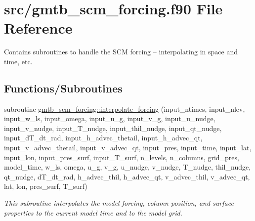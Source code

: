 \hypertarget{gmtb__scm__forcing_8f90}{}\section{src/gmtb\+\_\+scm\+\_\+forcing.f90 File Reference}
\label{gmtb__scm__forcing_8f90}


Contains subroutines to handle the S\+CM forcing -- interpolating in space and time, etc.  


\subsection*{Functions/\+Subroutines}
{\bf }\par
\begin{DoxyCompactItemize}
\item 
subroutine \hyperlink{group__forcing_gaee4d8a92d081863df4499f2e1dce82bd}{gmtb\+\_\+scm\+\_\+forcing\+::interpolate\+\_\+forcing} (input\+\_\+ntimes, input\+\_\+nlev, input\+\_\+w\+\_\+ls, input\+\_\+omega, input\+\_\+u\+\_\+g, input\+\_\+v\+\_\+g, input\+\_\+u\+\_\+nudge,           input\+\_\+v\+\_\+nudge, input\+\_\+\+T\+\_\+nudge, input\+\_\+thil\+\_\+nudge, input\+\_\+qt\+\_\+nudge, input\+\_\+d\+T\+\_\+dt\+\_\+rad, input\+\_\+h\+\_\+advec\+\_\+thetail, input\+\_\+h\+\_\+advec\+\_\+qt,           input\+\_\+v\+\_\+advec\+\_\+thetail, input\+\_\+v\+\_\+advec\+\_\+qt, input\+\_\+pres, input\+\_\+time, input\+\_\+lat, input\+\_\+lon, input\+\_\+pres\+\_\+surf, input\+\_\+\+T\+\_\+surf, n\+\_\+levels,       n\+\_\+columns, grid\+\_\+pres, model\+\_\+time, w\+\_\+ls, omega, u\+\_\+g, v\+\_\+g, u\+\_\+nudge, v\+\_\+nudge, T\+\_\+nudge, thil\+\_\+nudge, qt\+\_\+nudge, d\+T\+\_\+dt\+\_\+rad,           h\+\_\+advec\+\_\+thil, h\+\_\+advec\+\_\+qt, v\+\_\+advec\+\_\+thil, v\+\_\+advec\+\_\+qt, lat, lon, pres\+\_\+surf, T\+\_\+surf)
\begin{DoxyCompactList}\small\item\em This subroutine interpolates the model forcing, column position, and surface properties to the current model time and to the model grid. \end{DoxyCompactList}\end{DoxyCompactItemize}

